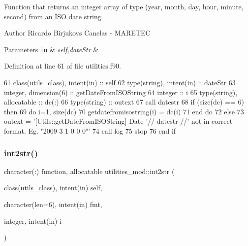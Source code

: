 Function that returns an integer array of type (year, month, day, hour, minute, second) from an I\+SO date string. 

\begin{DoxyAuthor}{Author}
Ricardo Birjukovs Canelas -\/ M\+A\+R\+E\+T\+EC 
\end{DoxyAuthor}

\begin{DoxyParams}[1]{Parameters}
\mbox{\tt in}  & {\em self,date\+Str} & \\
\hline
\end{DoxyParams}


Definition at line 61 of file utilities.\+f90.


\begin{DoxyCode}
61     \textcolor{keywordtype}{class}(utils\_class), \textcolor{keywordtype}{intent(in)} :: self
62     \textcolor{keywordtype}{type}(string), \textcolor{keywordtype}{intent(in)} :: dateStr
63     \textcolor{keywordtype}{integer}, \textcolor{keywordtype}{dimension(6)} :: getDateFromISOString
64     \textcolor{keywordtype}{integer} :: i
65     \textcolor{keywordtype}{type}(string), \textcolor{keywordtype}{allocatable} :: dc(:)
66     \textcolor{keywordtype}{type}(string) :: outext
67     \textcolor{keyword}{call }datestr%
68     \textcolor{keywordflow}{if} (\textcolor{keyword}{size}(dc) == 6) \textcolor{keywordflow}{then}
69         \textcolor{keywordflow}{do} i=1, \textcolor{keyword}{size}(dc)
70             getdatefromisostring(i) = dc(i)%
71 \textcolor{keywordflow}{        end do}
72     \textcolor{keywordflow}{else}
73         outext = \textcolor{stringliteral}{'[Utils::getDateFromISOString] Date '}// datestr //\textcolor{stringliteral}{' not in correct format. Eg. "2009 3 1 0
       0 0"'}
74         \textcolor{keyword}{call }log%
75         stop
76 \textcolor{keywordflow}{    end if}
\end{DoxyCode}
\mbox{\label{namespaceutilities__mod_a6ba00b0a503f26c7e755d1efbbe83c5b}} 
\subsubsection{\texorpdfstring{int2str()}{int2str()}}
{\footnotesize\ttfamily character(\+:) function, allocatable utilities\+\_\+mod\+::int2str (\begin{DoxyParamCaption}\item[{class(\mbox{\hyperlink{structutilities__mod_1_1utils__class}{utils\+\_\+class}}), intent(in)}]{self,  }\item[{character(len=6), intent(in)}]{fmt,  }\item[{integer, intent(in)}]{i }\end{DoxyParamCaption})\hspace{0.3cm}{\ttfamily [private]}}



